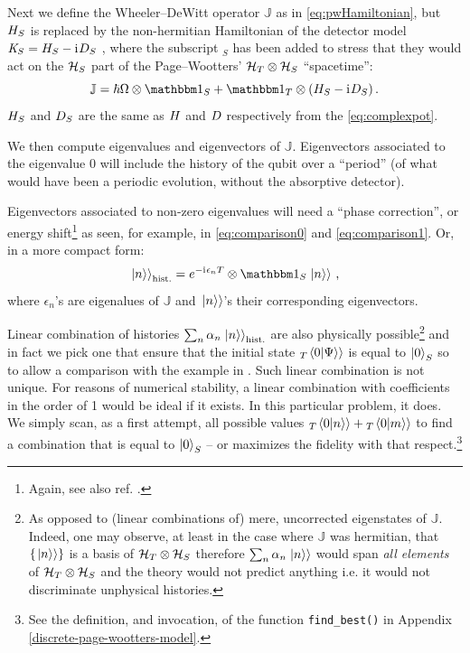 Next we define the Wheeler--DeWitt operator $\mathbb{J}$ as in
\eqref{eq:pwHamiltonian}, but ${H}_S$ is replaced by the non-hermitian
Hamiltonian of the detector model
$\mathit{K}_S = {H}_S - \mathrm{i}\mkern1mu {D}_S$
\parencite{RuschhauptAbsorption},
where the subscript $_S$ has been added to stress
that they would act on the $\mathcal{H}_S$ part
of the Page--Wootters' $\mathcal{H}_T \otimes \mathcal{H}_S$ ``spacetime'':
\begin{equation}\label{eq:pwHamiltonian:nonUnitary}
  \mathbb{J} = \hbar\op{\Omega}\ox\idop_S + \idop_T\ox\qty(\op{H}_S -\iu \op{D}_S) \,\text{.}
\end{equation}
${H}_S$ and ${D}_S$ are the same as ${H}$ and ${D}$
respectively from the \eqref{eq:complexpot}.

We then compute eigenvalues and eigenvectors of $\mathbb{J}$.
Eigenvectors associated to the eigenvalue $0$ will include
the history of the qubit over a ``period''
(of what would have been a periodic evolution, without the absorptive detector).

Eigenvectors associated to non-zero eigenvalues will need a ``phase correction'',
or energy shift\footnote{ Again, see also ref. \cite[sec.``The Zero-eigenvalue'']{Lloyd:Time}. }
as seen, for example, in \eqref{eq:comparison0} and \eqref{eq:comparison1}.
Or, in a more compact form:
\begin{equation}
  \dket{n}_{\text{hist.}} = e^{-\iu \epsilon_n \op{T}} \ox \idop_S \dket{n}
  \,\text{,}
\end{equation}
where $\epsilon_n$'s are eigenalues of $\mathbb{J}$ and
$\left.\left| n \right\rangle\right\rangle$'s their corresponding eigenvectors.

\citereset
Linear combination of histories $\sum_n \alpha_n \left.\left| n \right\rangle\right\rangle_{\text{hist.}}$
are also physically possible\footnote{
  As opposed to (linear combinations of) mere, uncorrected eigenstates of $\mathbb{J}$.
  Indeed, one may observe,
  at least in the case where $\mathbb{J}$ was hermitian,
  that $\left\{\left.\left| n \right\rangle\right\rangle\right\}$ is a basis
  of $\mathcal{H}_T \otimes \mathcal{H}_S$ therefore
  $\sum_n \alpha_n \left.\left| n \right\rangle\right\rangle$ would span \emph{all elements}
  of $\mathcal{H}_T \otimes \mathcal{H}_S$ and the theory would not predict anything i.e.
  it would not discriminate unphysical histories.
}
and in fact we pick
one that ensure that the initial state ${}_{T}\!\left.\left\langle 0 \middle| \Psi \right\rangle\right\rangle$ is equal to $\ket{0}_S$
so to allow a comparison with the example in \cite{RuschhauptAbsorption}.
Such linear combination is not unique. For reasons of numerical stability,
a linear combination with coefficients in the order of 1 would be ideal if it exists.
In this particular problem, it does.
We simply scan, as a first attempt, all possible values ${}_{T}\!\left.\left\langle 0 \middle| n \right\rangle\right\rangle + {}_{T}\!\left.\left\langle 0 \middle| m \right\rangle\right\rangle$
to find a combination that is equal to $\ket{0}_S$
-- or maximizes the fidelity with that respect.\footnote{
  See the definition, and invocation, of the function \texttt{find_best()} in Appendix \ref{discrete-page-wootters-model}.
}

